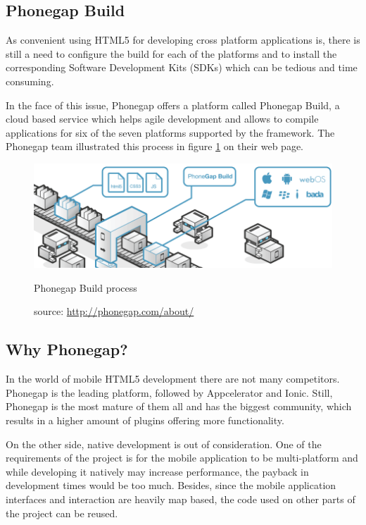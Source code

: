 \subsection*{Phonegap Build}

As convenient using HTML5 for developing cross platform applications is, there is still a need to configure the build for each of the platforms and to install the corresponding Software Development Kits (SDKs) which can be tedious and time consuming.

In the face of this issue, Phonegap offers a platform called Phonegap Build, a cloud based service which helps agile development and allows to compile applications for six of the seven platforms supported by the framework. The Phonegap team illustrated this process in figure \ref{fig:phonegapbuild} on their web page.

\begin{figure}[h]
  \centering
  \includegraphics[width=.8\textwidth]{fig/phonegap-build}
  \caption{Phonegap Build process}
  \caption*{source: \url{http://phonegap.com/about/}}
  \label{fig:phonegapbuild}
\end{figure} 

\subsection*{Why Phonegap?}

In the world of mobile HTML5 development there are not many competitors. Phonegap is the leading platform, followed by Appcelerator and Ionic. Still, Phonegap is the most mature of them all and has the biggest community, which results in a higher amount of plugins offering more functionality.

On the other side, native development is out of consideration. One of the requirements of the project is for the mobile application to be multi-platform and while developing it natively may increase performance, the payback in development times would be too much. Besides, since the mobile application interfaces and interaction are heavily map based, the code used on other parts of the project can be reused.

